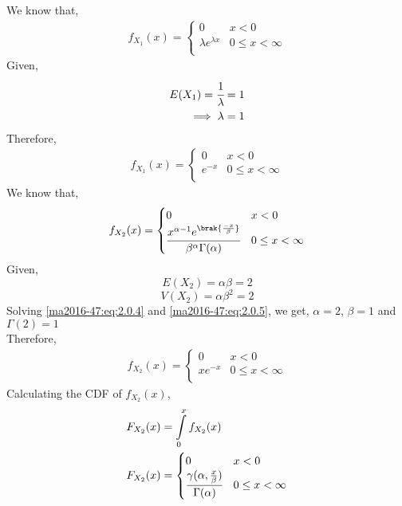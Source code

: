 
We know that,
\begin{align}
    f_{X_1}(x) = 
    \begin{cases}
    0   & x < 0\\
    \lambda e^{\lambda x} & 0\le x < \infty\\
    \end{cases}
\end{align}
Given, 
\begin{align}
   E(X_1)=\cfrac{1}{\lambda}&=1\\ 
   \implies \lambda &=1
\end{align}
Therefore,
\begin{align}
    f_{X_1}(x) = 
    \begin{cases}
    0   & x < 0\\
    e^{-x} & 0\le x < \infty\\
    \end{cases}
\end{align}
We know that,
\begin{align}
    f_{X_2}(x) = 
    \begin{cases}
    0   & x < 0\\
    \cfrac{x^{\alpha-1}e^{\brak{\frac{-x}{\beta}}}}{\beta^{\alpha}\Gamma(\alpha)} & 0\le x < \infty\\
    \end{cases}
\end{align}
Given, 
\begin{equation}\label{ma2016-47:eq:2.0.4}
    E(X_2)=\alpha \beta =2 
\end{equation}
\begin{equation}\label{ma2016-47:eq:2.0.5}
    V(X_2)=\alpha \beta^{2}=2 
\end{equation}
Solving \ref{ma2016-47:eq:2.0.4} and \ref{ma2016-47:eq:2.0.5}, we get,
$\alpha=2$, $\beta=1$ and $\Gamma(2)=1$\\
Therefore,
\begin{align}
    f_{X_2}(x) = 
    \begin{cases}
    0   & x < 0\\
    xe^{-x} & 0\le x < \infty\\
    \end{cases}
\end{align}
Calculating the CDF of $f_{X_2}(x)$,\\
\begin{align}
    F_{X_2}(x)&= \displaystyle\int\limits_0^x f_{X_2}(x)\\
    F_{X_2}(x)&=
    \begin{cases}
    0 & x<0\\
    \cfrac{\gamma(\alpha,\frac{x}{\beta})}{\Gamma(\alpha)} & 0 \le x <\infty
    \end{cases}
\end{align}
